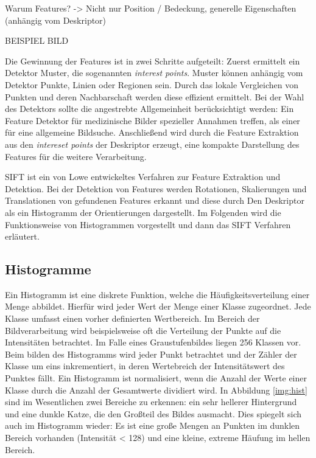 Warum Features? -> Nicht nur Position / Bedeckung, generelle Eigenschaften (anhängig vom Deskriptor)

BEISPIEL BILD

Die Gewinnung der Features ist in zwei Schritte aufgeteilt: Zuerst ermittelt ein Detektor Muster, die sogenannten \textit{interest points}. Muster können anhängig vom Detektor Punkte, Linien oder Regionen sein. Durch das lokale Vergleichen von Punkten und deren Nachbarschaft werden diese effizient ermittelt. Bei der Wahl des Detektors sollte die angestrebte Allgemeinheit berücksichtigt werden: Ein Feature Detektor für medizinische Bilder spezieller Annahmen treffen, als einer für eine allgemeine Bildsuche. Anschließend wird durch die Feature Extraktion aus den \textit{intereset points} der Deskriptor erzeugt, eine kompakte Darstellung des Features für die weitere Verarbeitung. 

SIFT ist ein von Lowe entwickeltes Verfahren zur Feature Extraktion und Detektion. Bei der Detektion von Features werden Rotationen, Skalierungen und Translationen von gefundenen Features erkannt und diese durch Den Deskriptor als ein Histogramm der Orientierungen dargestellt. Im Folgenden wird die Funktionsweise von Histogrammen vorgestellt und dann das SIFT Verfahren erläutert.

\cite{ifd2016}

\subsection{Histogramme}

Ein Histogramm ist eine diskrete Funktion, welche die Häufigkeitsverteilung einer Menge abbildet. Hierfür wird jeder Wert der Menge einer Klasse zugeordnet. Jede Klasse umfasst einen vorher definierten Wertbereich. Im Bereich der Bildverarbeitung wird beispielsweise oft die Verteilung der Punkte auf die Intensitäten betrachtet. Im Falle eines Graustufenbildes liegen 256 Klassen vor. Beim bilden des Histogramms wird jeder Punkt betrachtet und der Zähler der Klasse um eins inkrementiert, in deren Wertebreich der Intensitätswert des Punktes fällt. Ein Histogramm ist normalisiert, wenn die Anzahl der Werte einer Klasse durch die Anzahl der Gesamtwerte dividiert wird.
In Abbildung \ref{img:hist} sind im Wesentlichen zwei Bereiche zu erkennen: ein sehr hellerer Hintergrund und eine dunkle Katze, die den Großteil des Bildes ausmacht. Dies spiegelt sich auch im Histogramm wieder: Es ist eine große Mengen an Punkten im dunklen Bereich vorhanden (Intensität < 128) und eine kleine, extreme Häufung im hellen Bereich.

